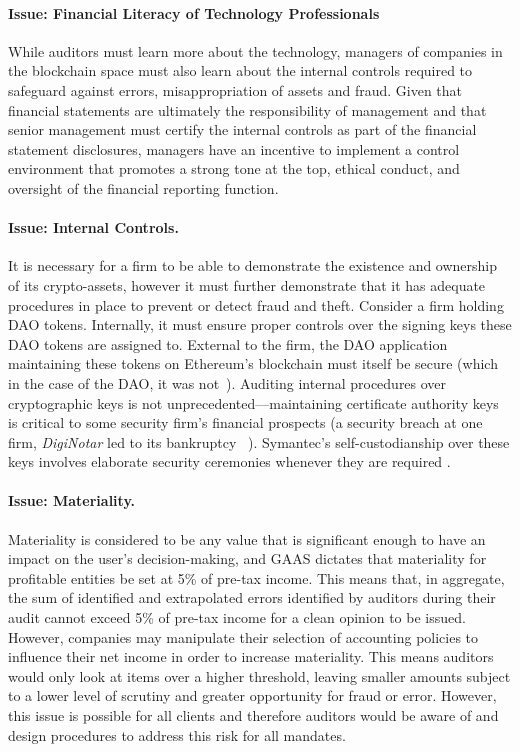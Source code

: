 \paragraph{Issue: Financial Literacy of Technology Professionals} While auditors must learn more about the technology, managers of companies in the blockchain space must also learn about the internal controls required to safeguard against errors, misappropriation of assets and fraud. Given that financial statements are ultimately the responsibility of management and that senior management must certify the internal controls as part of the financial statement disclosures, managers have an incentive to implement a control environment that promotes a strong tone at the top, ethical conduct, and oversight of the financial reporting function. %

\paragraph{Issue: Internal Controls.} It is necessary for a firm to be able to demonstrate the existence and ownership of its crypto-assets, however it must further demonstrate that it has adequate procedures in place to prevent or detect fraud and theft. Consider a firm holding DAO tokens. Internally, it must ensure proper controls over the signing keys these DAO tokens are assigned to. External to the firm, the DAO application maintaining these tokens on Ethereum{'}s blockchain must itself be secure (which in the case of the DAO, it was not~\cite{dupont2017experiments}). Auditing internal procedures over cryptographic keys is not unprecedented---maintaining certificate authority keys is critical to some security firm{'}s financial prospects (a security breach at one firm, \textit{DigiNotar} led to its bankruptcy ~\cite{zetter2011diginotar}). Symantec{'}s self-custodianship over these keys involves elaborate security ceremonies whenever they are required \todo{[Cite]}. 

\paragraph{Issue: Materiality.} Materiality is considered to be any value that is significant enough to have an impact on the user{'}s decision-making, and GAAS dictates that materiality for profitable entities be set at 5\% of pre-tax income. This means that, in aggregate, the sum of identified and extrapolated errors identified by auditors during their audit cannot exceed 5\% of pre-tax income for a clean opinion to be issued. However, companies may manipulate their selection of accounting policies to influence their net income in order to increase materiality. This means auditors would only look at items over a higher threshold, leaving smaller amounts subject to a lower level of scrutiny and greater opportunity for fraud or error. However, this issue is possible for all clients and therefore auditors would be aware of and design procedures to address this risk for all mandates.
 
